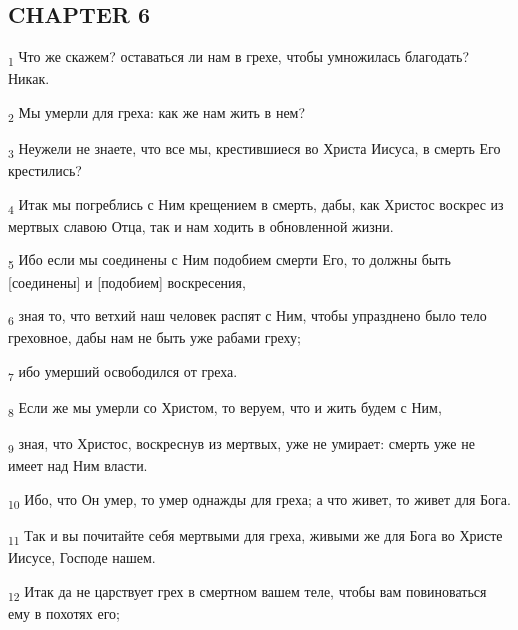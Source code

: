 \subsection{CHAPTER 6}
\begin{tcolorbox}
\textsubscript{1} Что же скажем? оставаться ли нам в грехе, чтобы умножилась благодать? Никак.
\end{tcolorbox}
\begin{tcolorbox}
\textsubscript{2} Мы умерли для греха: как же нам жить в нем?
\end{tcolorbox}
\begin{tcolorbox}
\textsubscript{3} Неужели не знаете, что все мы, крестившиеся во Христа Иисуса, в смерть Его крестились?
\end{tcolorbox}
\begin{tcolorbox}
\textsubscript{4} Итак мы погреблись с Ним крещением в смерть, дабы, как Христос воскрес из мертвых славою Отца, так и нам ходить в обновленной жизни.
\end{tcolorbox}
\begin{tcolorbox}
\textsubscript{5} Ибо если мы соединены с Ним подобием смерти Его, то должны быть [соединены] и [подобием] воскресения,
\end{tcolorbox}
\begin{tcolorbox}
\textsubscript{6} зная то, что ветхий наш человек распят с Ним, чтобы упразднено было тело греховное, дабы нам не быть уже рабами греху;
\end{tcolorbox}
\begin{tcolorbox}
\textsubscript{7} ибо умерший освободился от греха.
\end{tcolorbox}
\begin{tcolorbox}
\textsubscript{8} Если же мы умерли со Христом, то веруем, что и жить будем с Ним,
\end{tcolorbox}
\begin{tcolorbox}
\textsubscript{9} зная, что Христос, воскреснув из мертвых, уже не умирает: смерть уже не имеет над Ним власти.
\end{tcolorbox}
\begin{tcolorbox}
\textsubscript{10} Ибо, что Он умер, то умер однажды для греха; а что живет, то живет для Бога.
\end{tcolorbox}
\begin{tcolorbox}
\textsubscript{11} Так и вы почитайте себя мертвыми для греха, живыми же для Бога во Христе Иисусе, Господе нашем.
\end{tcolorbox}
\begin{tcolorbox}
\textsubscript{12} Итак да не царствует грех в смертном вашем теле, чтобы вам повиноваться ему в похотях его;
\end{tcolorbox}
